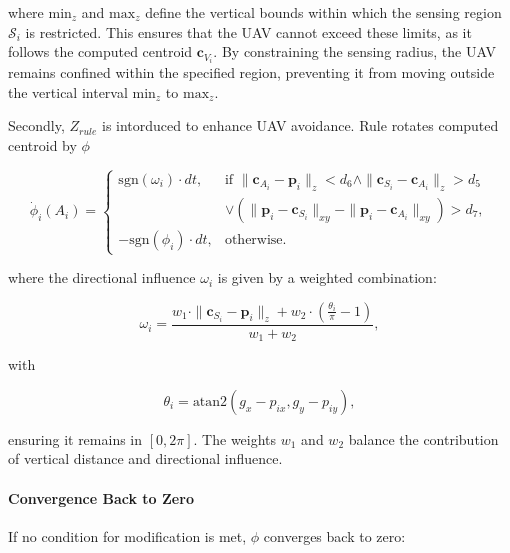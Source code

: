         where $\text{min}_z$ and $\text{max}_z$ define the vertical bounds within which the sensing region $\mathcal{S}_i$ is restricted. 
        This ensures that the UAV cannot exceed these limits, as it follows the computed centroid \( \mathbf{c}_{V_i} \). 
        By constraining the sensing radius, the UAV remains confined within the specified region, preventing it from moving outside the vertical interval $\text{min}_z$ to $\text{max}_z$.

        Secondly, $Z_{rule}$ is intorduced to enhance UAV avoidance. Rule rotates computed centroid by $\phi$

        \begin{equation}
            \dot{\phi}_i(A_i) =
            \begin{cases}
                \text{sgn}(\omega_i) \cdot dt, & \text{if } \|\mathbf{c}_{A_i} - \mathbf{p}_i\|_z < d_6 \land \|\mathbf{c}_{S_i} - \mathbf{c}_{A_i}\|_z > d_5 \\ 
                                               & \lor (\|\mathbf{p}_i - \mathbf{c}_{S_i}\|_{xy} - \|\mathbf{p}_i - \mathbf{c}_{A_i}\|_{xy}) > d_7, \\
                -\text{sgn}(\phi_i) \cdot dt,  & \text{otherwise.}
            \end{cases}
        \end{equation}
        
        where the directional influence \(\omega_i\) is given by a weighted combination:
        
        \begin{equation}
            \omega_i = \frac{w_1 \cdot \|\mathbf{c}_{S_i} - \mathbf{p}_i\|_z + w_2 \cdot \left(\frac{\theta_i}{\pi} - 1\right)}{w_1 + w_2},
        \end{equation}
        
        with 
        
        \begin{equation}
            \theta_i = \text{atan2}(g_x - p_{ix}, g_y - p_{iy}),
        \end{equation}
        
        ensuring it remains in \([0, 2\pi]\). The weights \(w_1\) and \(w_2\) balance the contribution of vertical distance and directional influence.
        
        \paragraph{Convergence Back to Zero}  
        If no condition for modification is met, \(\phi\) converges back to zero:
        
